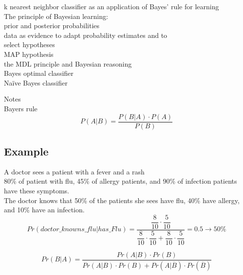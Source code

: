 \documentclass[a4paper,10pt,titlepage]{report}
\begin{document}
\hspace{10mm}		k nearest neighbor classifier as an application of Bayes’ rule for learning\\
	The principle of Bayesian learning:\\
\hspace{10mm}		prior and posterior probabilities\\
\hspace{10mm}		data as evidence to adapt probability estimates and to\\
\hspace{10mm}		select hypotheses \\
\hspace{10mm}		MAP hypothesis\\
\hspace{10mm}		the MDL principle and Bayesian reasoning\\
	Bayes optimal classifier\\
	Naïve Bayes classifier\\
	\vspace{10mm}
	
	Notes\\
	Bayers rule \\
	\hspace{10mm} \begin{equation}
	P(A|B) = \frac{P(B|A)\cdot P(A)}{P(B)}
	\end{equation}
	
	
	
	
	
\subsection{Example}
A doctor sees a patient with a fever and a rash \\
80\% of patient with flu, 45\% of allergy patients, and
90\% of infection patients have these symptoms. \\
The doctor knows that 50\% of the patients she sees
have flu, 40\% have allergy, and 10\% have an infection.
\begin{equation}
Pr(doctor\_knowns\_flu|has\_Flu) = \dfrac{\dfrac{8}{10}\cdot \dfrac{5}{10}}{\dfrac{8}{10}\cdot \dfrac{5}{10} + \dfrac{8}{10}\cdot \dfrac{5}{10}} = 0.5 \rightarrow 50 \%
\end{equation}

\begin{equation}
Pr(B|A) = \dfrac{ Pr(A|B) \cdot Pr(B) }
{Pr(A|B)\cdot Pr(B) + Pr(A|\overline{B}) \cdot Pr(\overline{B})}
\end{equation}
\end{document}
